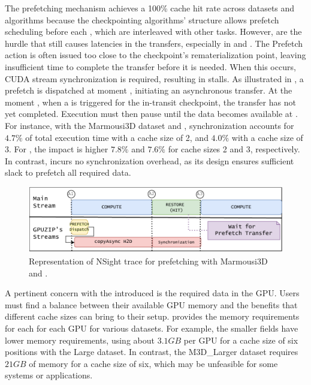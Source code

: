 \documentclass[Ingles,Final]{ic-tese-v3}
\begin{document}
The prefetching mechanism achieves a 100\% cache hit rate across datasets and algorithms because the checkpointing algorithms' structure allows prefetch scheduling before each \restore, which are interleaved with other tasks. However,  are the hurdle that still causes latencies in the \htd transfers, especially in \revolve and \zcut. The Prefetch action is often issued too close to the checkpoint's rematerialization point, leaving insufficient time to complete the transfer before it is needed. When this occurs, CUDA stream synchronization is required, resulting in stalls. As illustrated in , a prefetch is dispatched at moment , initiating an asynchronous transfer. At the moment , when a \restore is triggered for the in-transit checkpoint, the transfer has not yet completed. Execution must then pause until the data becomes available at . For instance, with the Marmousi3D dataset and \revolve, synchronization accounts for $4.7\%$ of total execution time with a cache size of 2, and $4.0\%$ with a cache size of 3. For \zcut, the impact is higher $7.8\%$ and $7.6\%$ for cache sizes 2 and 3, respectively. In contrast, \uniform incurs no synchronization overhead, as its design ensures sufficient slack to prefetch all required \checkpointing data.

\begin{figure}[h]
  \centering
  \includegraphics[width=0.8\linewidth,trim={0 0 0 0},clip]{figures/prefetch_profile.pdf}
  \caption[Checkpoint prefetching trace]{Representation of NSight trace for prefetching with Marmousi3D and \revolve.}
  \label{fig:prefetch_profile}
\end{figure}

A pertinent concern with the introduced \cache is the required data in the GPU. Users must find a balance between their available GPU memory and the benefits that different cache sizes can bring to their setup.  provides the memory requirements for each \cache for each GPU for various datasets. For example, the smaller fields have lower memory requirements, using about $3.1GB$ per GPU for a cache size of six positions with the Large dataset. In contrast, the M3D\_Larger dataset requires $21GB$ of memory for a cache size of six, which may be unfeasible for some systems or applications.
\end{document}
